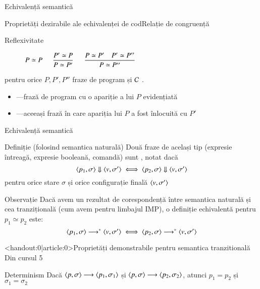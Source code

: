 \begin{section}{Echivalență semantică}
\begin{frame}{Proprietăți dezirabile ale echivalenței de cod}{Relație de congruență}
\begin{description}
\item[Reflexivitate] \hfill $\displaystyle \reg{P \simeq P}{}{}$ \hfill\;
\vitem[Simetrie] \hfill $\displaystyle \reg{P \simeq P'}{P' \simeq P}{}$ \hfill\;
\vitem[Tranzitivitate] \hfill $\displaystyle \reg{P \simeq P''}{P \simeq P' \si P' \simeq P''}{}$ \hfill\;
\vitem[Congruență] \hfill {} \hfill\;
\end{description}
\vfill
pentru orice $P, P', P''$ fraze de program și $\cal C$ .
\vfill
\begin{itemize}
\item[]  —frază de program cu o apariție a lui $P$ evidențiată
\item[]  —aceeași frază în care apariția lui $P$ a fost înlocuită cu $P'$
\end{itemize}
\end{frame}

\begin{frame}{Echivalență semantică}
\begin{block}{Definiție (folosind semantica naturală)}
Două fraze de același tip (expresie întreagă, expresie booleană, comandă) sunt , notat 
dacă
\[\displaystyle{\ensuremath {{\langle{p_1,\sigma}\rangle}} \Downarrow {{\ensuremath \langle{v,\sigma'}\rangle}}} \iff \displaystyle{\ensuremath {{\langle{p_2,\sigma}\rangle}} \Downarrow {{\ensuremath \langle{v,\sigma'}\rangle}}}\] 
 pentru orice stare $\sigma$ și orice configurație finală ${\langle{v,\sigma'}\rangle}$
\end{block}

\vfill 
\begin{block}{Observație}
Dacă avem un rezultat de corespondență între semantica naturală și cea tranzițională (cum avem pentru limbajul IMP), o definiție echivalentă pentru $p_1\simeq p_2$ este:
\[{{\langle{p_1,\sigma}\rangle}}\longrightarrow^\ast{{\ensuremath \langle{v,\sigma'}\rangle}} \iff {{\ensuremath \langle{p_2,\sigma}\rangle}}\longrightarrow^\ast{{\ensuremath \langle{v,\sigma'}\rangle}}\] 

\end{block}

\end{frame}

\begin{frame}<handout:0|article:0>{Proprietăți demonstrabile pentru semantica tranzitională}
{Din cursul 5}
\begin{block}{Determinism}  
Dacă ${\langle{p, \sigma}\rangle}\longrightarrow {\ensuremath \langle{p_1, \sigma_1}\rangle}$  și ${\langle{p, \sigma}\rangle} \longrightarrow {\ensuremath \langle{p_2, \sigma_2}\rangle}$, atunci $p_1 = p_2$ și $\sigma_1 = \sigma_2$
\end{block}


\end{frame}
\end{section}
